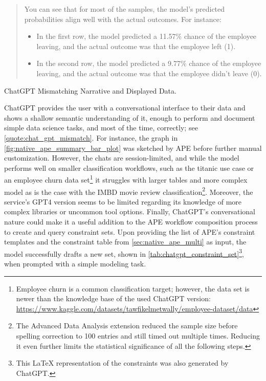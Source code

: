 \begin{chatquote}
\begin{quote}
You can see that for most of the samples,
the model's predicted probabilities align well with the actual outcomes. For instance:
\begin{itemize}
    \item In the first row, the model predicted a 11.57\% chance of the employee leaving, and the actual outcome was that the employee left (1).
    \item In the second row, the model predicted a 9.77\% chance of the employee leaving, and the actual outcome was that the employee didn't leave (0).
\end{itemize}
\end{quote}
\caption{ChatGPT Mismatching Narrative and Displayed Data.}
\label{quote:chat_gpt_mismatch}
\end{chatquote}

ChatGPT provides the user with a conversational interface to their data and shows a shallow semantic understanding of it, enough to perform and document simple data science tasks, and most of the time, correctly; see \autoref{quote:chat_gpt_mismatch}. For instance, the graph in \autoref{fig:native_ape_summary_bar_plot} was sketched by APE before further manual customization. However, the chats are session-limited, and while the model performs well on smaller classification workflows, such as the titanic use case or an employee churn data set\footnote{Employee churn is a common classification target; however, the data set is newer than the knowledge base of the used ChatGPT version: \url{https://www.kaggle.com/datasets/tawfikelmetwally/employee-dataset/data}} it struggles with larger tables and more complex model as is the case with the IMBD movie review classification\footnote{The Advanced Data Analysis extension reduced the sample size before spelling correction to 100 entries and still timed out multiple times. Reducing it even further limits the statistical significance of all the following steps.}. Moreover, the service's GPT4 version seems to be limited regarding its knowledge of more complex libraries or uncommon tool options. Finally, ChatGPT's conversational nature could make it a useful addition to the APE workflow composition process to create and query constraint sets. Upon providing the list of APE's constraint templates and the constraint table from \autoref{sec:native_ape_multi} as input, the model successfully drafts a new set, shown in \autoref{tab:chatgpt_constraint_set}\footnote{This LaTeX representation of the constraints was also generated by ChatGPT.}, when prompted with a simple modeling task.


